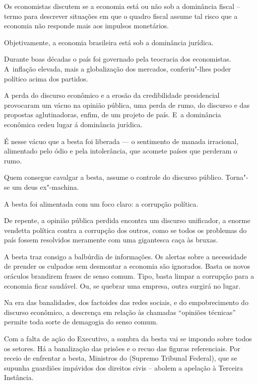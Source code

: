  

Os economistas discutem se a economia está ou não sob a dominância
fiscal -- termo para descrever situações em que o quadro fiscal assume
tal risco que a economia não responde mais aos impulsos monetários.

Objetivamente, a economia brasileira está sob a dominância jurídica.

Durante boas décadas o país foi governado pela teocracia dos
economistas. A~inflação elevada, mais a globalização dos mercados,
conferiu"-lhes poder político acima dos partidos.

A perda do discurso econômico e a erosão da credibilidade presidencial
provocaram um vácuo na opinião pública, uma perda de rumo, do discurso e
das propostas aglutinadoras, enfim, de um projeto de país. E~a
dominância econômica cedeu lugar á dominância jurídica.

\asterisc{}

É nesse vácuo que a besta foi liberada --- o sentimento de manada
irracional, alimentado pelo ódio e pela intolerância, que acomete países
que perderam o rumo.

Quem consegue cavalgar a besta, assume o controle do discurso público.
Torna"-se um deus ex"-machina.

A besta foi alimentada com um foco claro: a corrupção política.

De repente, a opinião pública perdida encontra um discurso unificador, a
enorme vendetta política contra a corrupção dos outros, como se todos os
problemas do país fossem resolvidos meramente com uma gigantesca caça às
bruxas.

\asterisc{}

A besta traz consigo a balbúrdia de informações. Os alertas sobre a
necessidade de prender os culpados sem desmontar a economia são
ignorados. Basta os novos oráculos brandirem frases de senso comum.
Tipo, basta limpar a corrupção para a economia ficar saudável. Ou, se
quebrar uma empresa, outra surgirá no lugar.

Na era das banalidades, dos factoides das redes sociais, e do
empobrecimento do discurso econômico, a descrença em relação às chamadas
``opiniões técnicas'' permite toda sorte de demagogia do senso comum.

\asterisc{}

Com a falta de ação do Executivo, a sombra da besta vai se impondo sobre
todos os setores. Há a banalização das prisões e o recuo das figuras
referenciais. Por receio de enfrentar a besta, Ministros do  (Supremo
Tribunal Federal), que se supunha guardiões impávidos dos direitos civis
-- abolem a apelação à Terceira Instância.

